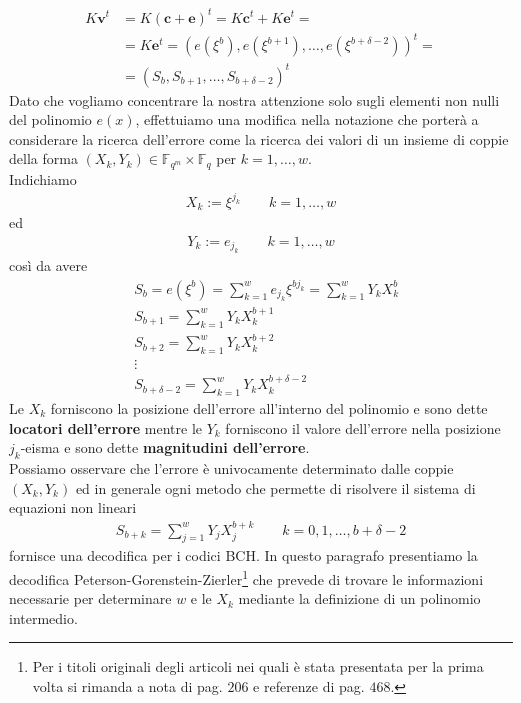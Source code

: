 \begin{align*}
   K \mathbf{v}^{t} &=  K (\mathbf{c} + \mathbf{e})^{t} = K \mathbf{c}^{t} + K \mathbf{e}^{t} = \\
                    &=  K \mathbf{e}^{t} = (e(\xi^{b}), e(\xi^{b+1}), \dots , e(\xi^{b + \delta - 2}))^{t}=
                    \\
                    &=  (S_{b}, S_{b+1}, \dots , S_{b + \delta - 2})^{t}
\end{align*}
Dato che vogliamo concentrare la nostra attenzione solo sugli elementi non nulli del polinomio $e(x)$, effettuiamo una modifica nella notazione che porterà a considerare la ricerca dell'errore come la ricerca dei valori di un insieme di coppie della forma $(X_{k},Y_{k}) \in \mathbb{F}_{q^{m}} \times \mathbb{F}_{q}$ per $k=1, \dots , w$.\\
Indichiamo
\begin{align*}
   X_{k} := \xi^{j_{k}} \qquad k = 1, \dots , w 
\end{align*}
ed
\begin{align*}
   Y_{k} := e_{j_{k}} \qquad k = 1, \dots , w 
\end{align*}
così da avere
\begin{align*}
   &S_{b} = e(\xi^{b}) = \sum_{k=1}^{w} e_{j_{k}} \xi^{b j_{k}} 
           = \sum_{k=1}^{w} Y_{k}X_{k}^{b} \\
   &S_{b+1} = \sum_{k=1}^{w} Y_{k}X_{k}^{b+1} \\
   &S_{b+2} = \sum_{k=1}^{w} Y_{k}X_{k}^{b+2} \\
   &  \vdots  \\
   &S_{b + \delta - 2} = \sum_{k=1}^{w} Y_{k}X_{k}^{b + \delta - 2}
\end{align*}
Le $X_{k}$ forniscono la posizione dell'errore all'interno del polinomio e sono dette {\bf locatori dell'errore} mentre le $Y_{k}$ forniscono il valore dell'errore nella posizione $j_{k}$-eisma
e sono dette {\bf magnitudini dell'errore}.\\
Possiamo osservare che l'errore è univocamente determinato dalle coppie $(X_{k},Y_{k})$ ed in generale ogni metodo che permette di risolvere il sistema di equazioni non lineari 
\begin{align}\label{sis:sistemaSYX}
   S_{b+k} = \sum_{j=1}^{w}Y_{j}X_{j}^{b+k} \qquad k = 0, 1, \dots, b + \delta - 2
\end{align}
fornisce una decodifica per i codici BCH. In questo paragrafo presentiamo la decodifica Peterson-Gorenstein-Zierler\footnote{Per i titoli originali degli articoli nei quali è stata presentata per la prima volta si rimanda a \cite{blahut} nota di pag. $206$ e referenze di pag. $468$. } che prevede di trovare le informazioni necessarie per determinare $w$ e le $X_{k}$ mediante la definizione di un polinomio intermedio.
